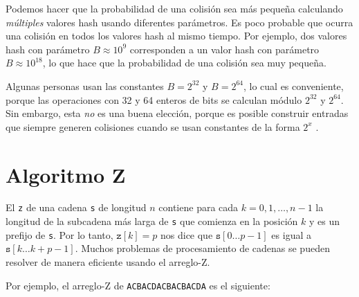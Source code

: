 Podemos hacer que la probabilidad de una colisión
sea más pequeña calculando \emph{múltiples} valores hash
usando diferentes parámetros.
Es poco probable que ocurra una colisión
en todos los valores hash al mismo tiempo.
Por ejemplo, dos valores hash con parámetro
$B \approx 10^9$ corresponden a un valor hash
con parámetro $B \approx 10^{18}$,
lo que hace que la probabilidad de una colisión sea muy pequeña.

Algunas personas usan las constantes $B=2^{32}$ y $B=2^{64}$,
lo cual es conveniente, porque las operaciones con 32 y 64
enteros de bits se calculan módulo $2^{32}$ y $2^{64}$.
Sin embargo, esta \emph{no} es una buena elección, porque es posible
construir entradas que siempre generen colisiones cuando
se usan constantes de la forma $2^x$ \cite{pac13}.

\section{Algoritmo Z}




El  \texttt{z} de una cadena \texttt{s}
de longitud $n$ contiene para cada $k=0,1,\ldots,n-1$
la longitud de la subcadena más larga de \texttt{s}
que comienza en la posición $k$ y es un prefijo de \texttt{s}.
Por lo tanto, $\texttt{z}[k]=p$ nos dice que
$\texttt{s}[0 \ldots p-1]$ es igual a $\texttt{s}[k \ldots k+p-1]$.
Muchos problemas de procesamiento de cadenas se pueden resolver de manera eficiente
usando el arreglo-Z.

Por ejemplo, el arreglo-Z de
\texttt{ACBACDACBACBACDA} es el siguiente:

